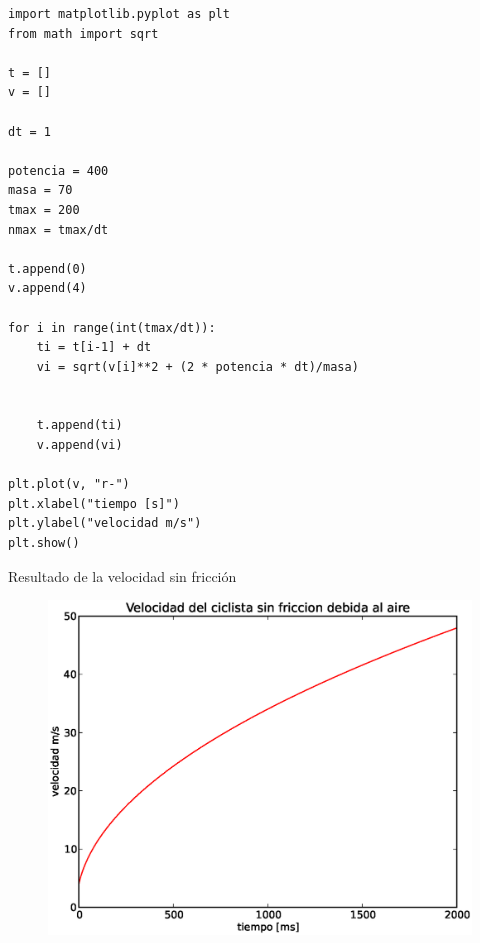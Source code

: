 \documentclass[12pt]{article}
\begin{document}
\begin{lstlisting}[basicstyle=\linespread{1.2}\ttfamily\small, columns=fullflexible,escapeinside=||]
import matplotlib.pyplot as plt
from math import sqrt

t = []
v = []

dt = 1

potencia = 400
masa = 70
tmax = 200
nmax = tmax/dt

t.append(0)
v.append(4)

for i in range(int(tmax/dt)):
    ti = t[i-1] + dt
    vi = sqrt(v[i]**2 + (2 * potencia * dt)/masa)
    
    
    t.append(ti)
    v.append(vi)

plt.plot(v, "r-")
plt.xlabel("tiempo [s]")
plt.ylabel("velocidad m/s")
plt.show()
\end{lstlisting}
Resultado de la velocidad sin fricción
\begin{figure}[H]
	\centering
	\includegraphics[scale=0.5]{EjerBicicleta01.eps}
\end{figure}
\end{document}
